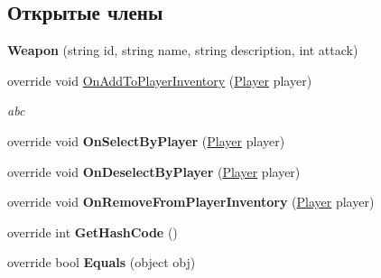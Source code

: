 \subsection*{Открытые члены}
\begin{DoxyCompactItemize}
\item 
\hypertarget{class_a_s_c_i_i_wars_1_1_game_1_1_weapon_ab292fb175c5d6e29ec2918069f831d4c}{}\label{class_a_s_c_i_i_wars_1_1_game_1_1_weapon_ab292fb175c5d6e29ec2918069f831d4c} 
{\bfseries Weapon} (string id, string name, string description, int attack)
\item 
\hypertarget{class_a_s_c_i_i_wars_1_1_game_1_1_weapon_ad29135a3edb4ea03f29163d788364299}{}\label{class_a_s_c_i_i_wars_1_1_game_1_1_weapon_ad29135a3edb4ea03f29163d788364299} 
override void \hyperlink{class_a_s_c_i_i_wars_1_1_game_1_1_weapon_ad29135a3edb4ea03f29163d788364299}{On\+Add\+To\+Player\+Inventory} (\hyperlink{class_a_s_c_i_i_wars_1_1_game_1_1_player}{Player} player)
\begin{DoxyCompactList}\small\item\em abc \end{DoxyCompactList}\item 
\hypertarget{class_a_s_c_i_i_wars_1_1_game_1_1_weapon_a6cd549ad51fa64884a66b1083098465f}{}\label{class_a_s_c_i_i_wars_1_1_game_1_1_weapon_a6cd549ad51fa64884a66b1083098465f} 
override void {\bfseries On\+Select\+By\+Player} (\hyperlink{class_a_s_c_i_i_wars_1_1_game_1_1_player}{Player} player)
\item 
\hypertarget{class_a_s_c_i_i_wars_1_1_game_1_1_weapon_aa03a588bfb93fbf63d4d7bf63ce62ae1}{}\label{class_a_s_c_i_i_wars_1_1_game_1_1_weapon_aa03a588bfb93fbf63d4d7bf63ce62ae1} 
override void {\bfseries On\+Deselect\+By\+Player} (\hyperlink{class_a_s_c_i_i_wars_1_1_game_1_1_player}{Player} player)
\item 
\hypertarget{class_a_s_c_i_i_wars_1_1_game_1_1_weapon_a1fc9edec1d3881aee188a30ddc8f9e58}{}\label{class_a_s_c_i_i_wars_1_1_game_1_1_weapon_a1fc9edec1d3881aee188a30ddc8f9e58} 
override void {\bfseries On\+Remove\+From\+Player\+Inventory} (\hyperlink{class_a_s_c_i_i_wars_1_1_game_1_1_player}{Player} player)
\item 
\hypertarget{class_a_s_c_i_i_wars_1_1_game_1_1_weapon_af252081d5a5f047785ed545946bb5214}{}\label{class_a_s_c_i_i_wars_1_1_game_1_1_weapon_af252081d5a5f047785ed545946bb5214} 
override int {\bfseries Get\+Hash\+Code} ()
\item 
\hypertarget{class_a_s_c_i_i_wars_1_1_game_1_1_weapon_a281a4ca4d8a376aeda8408551ee168cf}{}\label{class_a_s_c_i_i_wars_1_1_game_1_1_weapon_a281a4ca4d8a376aeda8408551ee168cf} 
override bool {\bfseries Equals} (object obj)
\end{DoxyCompactItemize}
